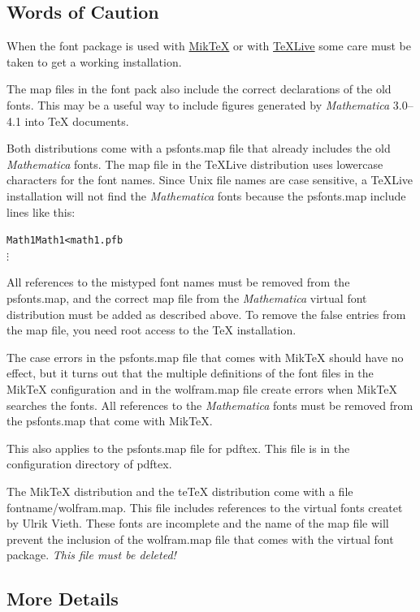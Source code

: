 \documentclass{article}
\newcommand{\teTeX}{\textsf{te\TeX}\xspace}
\newcommand{\MikTeX}{\textsf{Mik\TeX}\xspace}
\newcommand{\Math}{\textit{Mathematica}\xspace}
\begin{document}
\subsection{Words of Caution}

When the font package is used with
\href{http://www.miktex.org}{\MikTeX} or with
\href{http://www.tug.org/texlive}{TeXLive} some care must be taken to
get a working installation.

The map files in the font pack also include the correct declarations
of the old fonts. This may be a useful way to include figures
generated by \Math 3.0--4.1 into \TeX{} documents.

Both distributions come with a \textsf{psfonts.map} file that already
includes the old \Math{} fonts. The map file in the TeXLive
distribution uses lowercase characters for the font names. Since Unix
file names are case sensitive, a TeXLive installation will not find
the \Math{} fonts because the \textsf{psfonts.map} include lines
like this:
\begin{alltt}
Math1 Math1 <math1.pfb
\(\vdots\)
\end{alltt}
%
All references to the mistyped font names must be removed from the
\textsf{psfonts.map}, and the correct map file from the \Math{}
virtual font distribution must be added as described above.  To remove
the false entries from the map file, you need root access to the
\TeX{} installation.

The case errors in the \textsf{psfonts.map} file that comes with
\MikTeX should have no effect, but it turns out that the multiple
definitions of the font files in the \MikTeX configuration and in the
\textsf{wolfram.map} file create errors when \MikTeX searches the
fonts. All references to the \Math{} fonts must be removed from
the \textsf{psfonts.map} that come with \MikTeX.

This also applies to the \textsf{psfonts.map} file for
\textsf{pdftex}.  This file is in the configuration directory of
\textsf{pdftex}.
\begin{sloppypar}
The \MikTeX distribution and the \teTeX distribution come with a file
\textsf{fontname/wolfram.map}. This file includes references to the
virtual fonts createt by Ulrik Vieth. These fonts are incomplete and
the name of the map file will prevent the inclusion of the
\textsf{wolfram.map} file that comes with the virtual font package.
\emph{This file must be deleted!}
\end{sloppypar}


\subsection{More Details}
\end{document}
